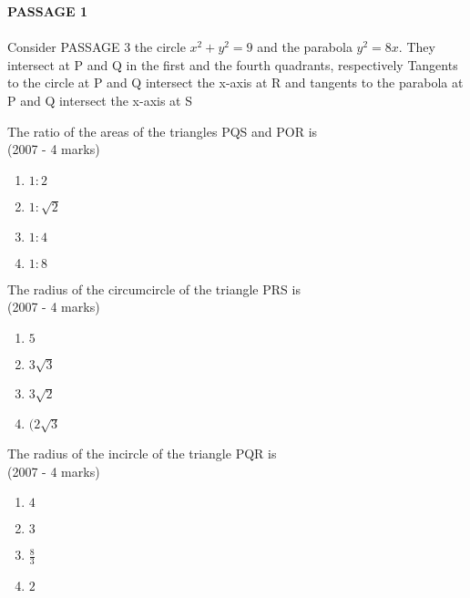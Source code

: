 \iffalse
\title{Assignment 1}
\author{Teja Vardhan}
\section{paragraph}
\fi
\textbf{PASSAGE 1 }\\\\
Consider PASSAGE 3 the circle $x^2 +y^2=9$ and the parabola $y^2 = 8x$. They
intersect at P and Q in the first and the fourth quadrants,
respectively Tangents to the circle at P and Q intersect the x-axis
at R and tangents to the parabola at P and Q intersect the x-axis at S \\
\item  The ratio of the areas of the triangles PQS and POR is  \\
\hfill(2007 - 4 marks)

\begin{enumerate}[label=(\alph*)]
    \item $1 : 2 $
    \item $1 : \sqrt{2}$
    \item $1 : 4 $
    \item $1 : 8$
\end{enumerate}

\item  The radius of the circumcircle of the triangle PRS is \\ \hfill {(2007 - 4 marks)}

\begin{enumerate}[label=(\alph*)]
    \item $5$
    \item $3\sqrt{3}$
    \item $3\sqrt{2}$
    \item $(2\sqrt{3}$
\end{enumerate}

\item   The radius of the incircle of the triangle PQR is \\ {(2007 - 4 marks)}

\begin{enumerate}[label=(\alph*)]
    \item $4$
    \item $3$
    \item $\frac{8}{3}$
    \item $2$
\end{enumerate} 



